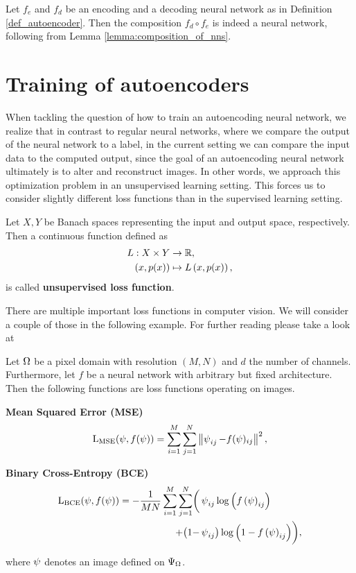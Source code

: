 \begin{remark}
Let $f_e$ and $f_d$ be an encoding and a decoding neural network as in Definition \ref{def_autoencoder}. Then the composition $f_d \circ f_e$ is indeed a neural network, following from Lemma \ref{lemma:composition_of_nns}.
\end{remark}


\section{Training of autoencoders}

When tackling the question of how to train an autoencoding neural network, we realize that in contrast to regular neural networks, where we compare the output of the neural network to a label, in the current setting we can compare the input data to the computed output, since the goal of an autoencoding neural network ultimately is to alter and reconstruct images. In other words, we approach this optimization problem in an unsupervised learning setting. This forces us to consider slightly different loss functions than in the supervised learning setting.


\begin{definition}
Let $X, Y$ be Banach spaces representing the input and output space, respectively.\\
Then a continuous function defined as
\begin{align*}
L:X\times Y &\to \operatorname{\mathbb{R}},\\
\left(x, p(x)\right) &\mapsto L\left(x, p(x)\right),
\end{align*}
is called \textbf{unsupervised loss function}.
\end{definition}


There are multiple important loss functions in computer vision. We will consider a couple of those in the following example. For further reading please take a look at \cite{foster2022generative}


\begin{example}
Let $\Omega$ be a pixel domain with resolution $(M,N)$ and $d$ the number of channels. Furthermore, let $f$ be a neural network with arbitrary but fixed architecture.\\
Then the following functions are loss functions operating on images.
\begin{mydescription}{}
\item[\textbf{Mean Squared Error (MSE)}] \begin{align*}
\operatorname{L_\text{MSE}}(\operatorname{\psi}, f(\operatorname{\psi})) = \sum_{i=1}^{M}\sum_{j=1}^{N}\left\|\operatorname{\psi}_{ij} - f(\operatorname{\psi})_{ij}\right\|^2,
\end{align*}
\item[\textbf{Binary Cross-Entropy (BCE)}]
\begin{align*}
\operatorname{L_\text{BCE}}(\operatorname{\psi}, f(\operatorname{\psi})) = - \frac{1}{MN}\sum_{i=1}^{M}\sum_{j=1}^{N} \biggl(&\operatorname{\psi}_{ij} \log\left(f\left(\operatorname{\psi}\right)_{ij}\right)\\ + \bigl(1-&\operatorname{\psi}_{ij}\bigr)\log\left(1 - f\left(\operatorname{\psi}\right)_{ij}\right)\biggr),
\end{align*}
\end{mydescription}
where $\operatorname{\psi}$ denotes an image defined on $\Psi_{\Omega}$.
\end{example}


